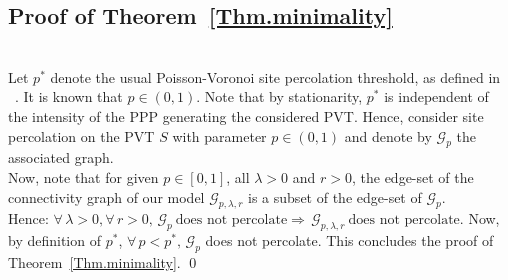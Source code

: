 \documentclass[10pt,a4paper]{amsart}
\theoremstyle{exampstyle}
\theoremstyle{exampnotations}
\begin{document}
\subsection{Proof of Theorem~\ref{Thm.minimality}}\mbox{}\\
\indent Let $p^*$ denote the usual Poisson-Voronoi site percolation threshold, as defined in ~\cite{becker_percolation_2009,neher2008topological}. It is known that $p \in \left(0,1\right)$. Note that by stationarity, $p^*$ is independent of the intensity of the PPP generating the considered PVT. Hence, consider site percolation on the PVT $S$ with parameter $p \in \left(0,1\right)$ and denote by $\mathcal{G}_p$ the associated graph. \\
Now, note that for given $p \in \left[0,1\right]$, all $\lambda >0$ and $r>0$, the edge-set of the connectivity graph of our model $\mathcal{G}_{p,\lambda,r}$ is a subset of the edge-set of $\mathcal{G}_p$. 
\\Hence: $\forall \, \lambda >0, \forall \, r>0, \, \mathcal{G}_{p} \ \text{does not percolate} \Rightarrow \, \mathcal{G}_{p,\lambda,r} \ \text{does not percolate}$.
Now, by definition of $p^*$, $\forall \, p < p^*, \, \mathcal{G}_p$ does not percolate. This concludes the proof of Theorem~\ref{Thm.minimality}. \qed
\\
\end{document}
